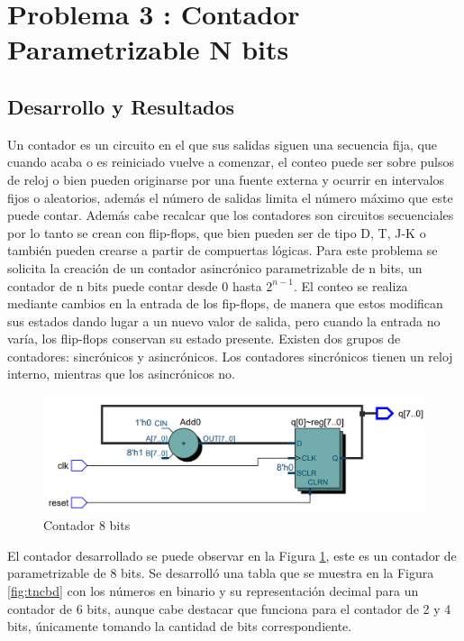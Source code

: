 \documentclass[journal]{IEEEtran}
\begin{document}
	
	\section{Problema 3 : Contador Parametrizable N bits }
	\subsection{Desarrollo y Resultados}
	Un contador es un circuito en el que sus salidas siguen una secuencia fija, que cuando acaba o es reiniciado vuelve a comenzar, el conteo puede ser sobre pulsos de reloj o bien pueden originarse por una fuente externa y ocurrir en intervalos fijos o aleatorios, además el número de salidas limita el número máximo que este puede contar. 
	Además cabe recalcar que los contadores son circuitos secuenciales por lo tanto se crean con flip-flops, que bien pueden ser de tipo D, T, J-K o también pueden crearse a partir de compuertas lógicas.
	Para este problema se solicita la creación de un contador asincrónico parametrizable de n bits, un contador de n bits puede contar desde 0 hasta $2^{n-1}$. El conteo se realiza mediante cambios en la entrada de los fip-flops, de manera que estos modifican sus estados dando lugar a un nuevo valor de salida, pero cuando la entrada no varía, los flip-flops conservan su estado presente.
	Existen dos grupos de contadores: sincrónicos y asincrónicos. Los contadores sincrónicos tienen un reloj interno, mientras que los asincrónicos no.
	
	\begin{figure}[htb]
		\centering
		\includegraphics[scale = 0.22]{img/p3/counter8b.png}
		\caption{Contador 8 bits}
		\label{fig:counter8b}
	\end{figure}
	
	El contador desarrollado se puede observar en la Figura \ref{fig:counter8b}, este es un contador de parametrizable de 8 bits. Se desarrolló una tabla  que se muestra en la Figura \ref{fig:tncbd} con los números en binario y su representación decimal para un contador de 6 bits, aunque cabe destacar que funciona para el contador de 2 y 4 bits, únicamente tomando la cantidad de bits correspondiente.
	
\end{document}
